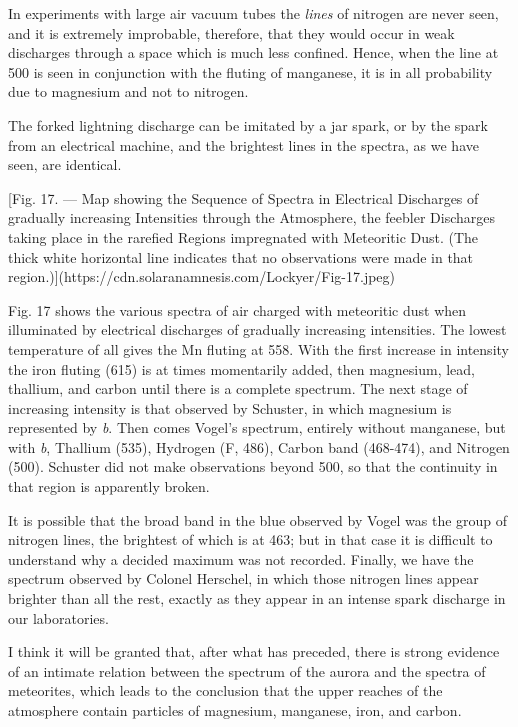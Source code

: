 \documentclass[a4paper, 12pt, oneside, polutonikogreek, english]{article}
\begin{document}
In experiments with large air vacuum tubes the \emph{lines} of nitrogen are never seen, and it is extremely improbable, therefore, that they would occur in weak discharges through a space which is much less confined. Hence, when the line at 500 is seen in conjunction with the fluting of manganese, it is in all probability due to magnesium and not to nitrogen.

The forked lightning discharge can be imitated by a jar spark, or by the spark from an electrical machine, and the brightest lines in the spectra, as we have seen, are identical.

[Fig. 17. --- Map showing the Sequence of Spectra in Electrical Discharges of gradually increasing Intensities through the Atmosphere, the feebler Discharges taking place in the rarefied Regions impregnated with Meteoritic Dust. (The thick white horizontal line indicates that no observations were made in that region.)](https://cdn.solaranamnesis.com/Lockyer/Fig-17.jpeg)

Fig. 17 shows the various spectra of air charged with meteoritic dust when illuminated by electrical discharges of gradually increasing intensities. The lowest temperature of all gives the Mn fluting at 558. With the first increase in intensity the iron fluting (615) is at times momentarily added, then magnesium, lead, thallium, and carbon until there is a complete spectrum. The next stage of increasing intensity is that observed by Schuster, in which magnesium is represented by \emph{b}. Then comes Vogel's spectrum, entirely without manganese, but with \emph{b}, Thallium (535), Hydrogen (F, 486), Carbon band (468-474), and Nitrogen (500). Schuster did not make observations beyond 500, so that the continuity in that region is apparently broken.

It is possible that the broad band in the blue observed by Vogel was the group of nitrogen lines, the brightest of which is at 463; but in that case it is difficult to understand why a decided maximum was not recorded. Finally, we have the spectrum observed by Colonel Herschel, in which those nitrogen lines appear brighter than all the rest, exactly as they appear in an intense spark discharge in our laboratories.

I think it will be granted that, after what has preceded, there is strong evidence of an intimate relation between the spectrum of the aurora and the spectra of meteorites, which leads to the conclusion that the upper reaches of the atmosphere contain particles of magnesium, manganese, iron, and carbon.
\end{document}

